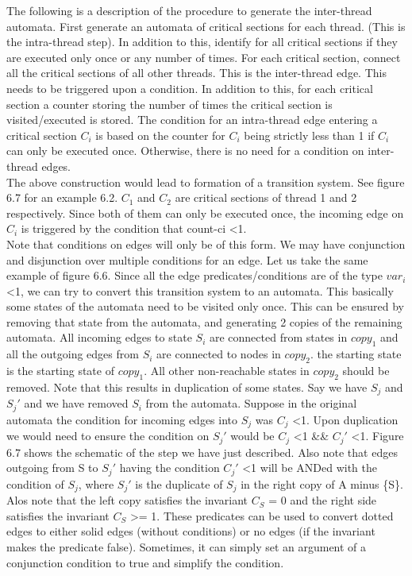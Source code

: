 The following is a description of the procedure to generate the inter-thread automata. First generate an automata of critical sections for each thread. (This is the intra-thread step). In addition to this, identify for all critical sections if they are executed only once or any number of times. For each critical section, connect all the critical sections of all other threads. This is the inter-thread edge. This needs to be triggered upon a condition. In addition to this, for each critical section a counter storing the number of times the critical section is visited/executed is stored. The condition for an intra-thread edge entering a critical section $C_i$ is based on the counter for $C_i$ being strictly less than 1 if $C_i$ can only be executed once. Otherwise, there is no need for a condition on inter-thread edges. \\

The above construction would lead to formation of a transition system. See figure 6.7 for an example 6.2. $C_1$ and $C_2$
are critical sections of thread 1 and 2 respectively. Since both of them can only be executed once, the incoming edge on $C_i$ is triggered by the condition that count-ci \textless 1. \\

Note that conditions on edges will only be of this form. We may have conjunction and disjunction over multiple conditions for an edge. Let us take the same example of figure 6.6. Since all the edge predicates/conditions are of the type $var_i$ \textless 1, we can try to convert this transition system to an automata. This basically some states of the automata need to be visited only once. This can be ensured by removing that state from the automata, and generating 2 copies of the remaining automata. All incoming edges to state $S_i$ are connected from states in $copy_1$ and all the outgoing edges from $S_i$ are connected to nodes in $copy_2$. the starting state is the starting state of $copy_1$. All other non-reachable states in $copy_2$ should be removed. Note that this results in duplication of some states. Say we have $S_j$ and $S_j'$ and we have removed $S_i$ from the automata. Suppose in the original automata the condition for incoming edges into $S_j$ was $C_j$ \textless 1. Upon duplication we would need to ensure the condition on $S_j'$ would be $C_j$ \textless 1 \&\& $C_j'$ \textless 1. Figure 6.7 shows the schematic of the step we have just described. Also note that edges outgoing from S to $S_j'$ having the condition $C_j'$ \textless 1 will be ANDed with the condition of $S_j$, where $S_j'$ is the duplicate of $S_j$ in the right copy of A minus \{S\}. Alos note that the left copy satisfies the invariant $C_S$ = 0 and the right side satisfies the invariant $C_S$ >= 1. These predicates can be used to convert dotted edges to either solid edges (without conditions) or no edges (if the invariant makes the predicate false). Sometimes, it can simply set an argument of a conjunction condition to true and simplify the condition. \\
   


